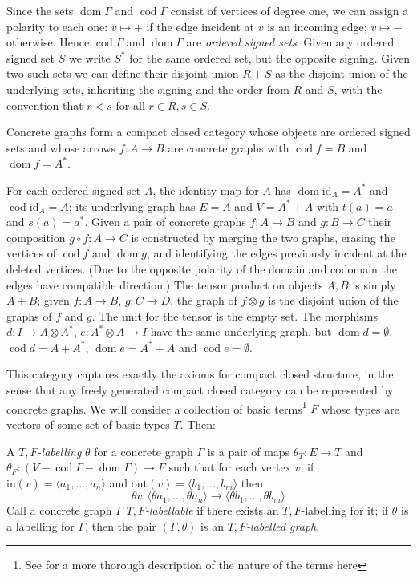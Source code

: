 \documentclass[runningheads]{llncs}
\newcommand{\dom}{\operatorname{dom}}
\newcommand{\cod}{\operatorname{cod}}
\newcommand{\id}[1]{\ensuremath{\mathrm{id}_{#1}}}
\begin{document}
Since the sets $\dom\Gamma$ and $\cod\Gamma$ consist of vertices of degree
one, we can assign a polarity to each one:  $v \mapsto +$ if the edge
incident at $v$ is an incoming edge; $v \mapsto -$ otherwise.  Hence
$\cod \Gamma$ and $\dom \Gamma$ are \emph{ordered signed sets}.  Given any
ordered signed set $S$ we write $S^*$ for the same ordered set, but
the opposite signing.   Given two such sets we can define their disjoint
union $R+S$ as the disjoint union of the underlying sets, inheriting
the signing and the order from $R$ and $S$, with the convention that
$r < s$ for all $r\in R, s\in S$.

\begin{proposition}
Concrete graphs form a compact closed category whose objects are
ordered signed sets and whose arrows $f:A\to B$ are concrete graphs with
$\cod f = B$  and $\dom f = A^*$.
\end{proposition}
For each ordered signed set $A$, the identity map for $A$ has
$\dom \id{A} = A^*$ and $\cod \id{A} = A$; its underlying
graph has $E = A$ and $V = A^* + A$ with $t(a) = a$ and $s(a) =
a^*$.  Given a pair of concrete graphs $f:A\to B$ and $g:B\to C$ their
composition $g\circ f:A\to C$ is constructed by merging the two
graphs, erasing the vertices of $\cod f$ and $\dom g$, and identifying
the edges previously incident at the deleted vertices.  (Due to the
opposite polarity of the domain and codomain the edges have compatible
direction.)  The tensor product on objects $A,B$ is simply $A+B$;
given $f:A\to B$, $g: C\to D$, the graph of $f \otimes g$ is the
disjoint union of the graphs of $f$ and $g$.  The unit for the tensor
is the empty set.  The morphisms $d : I \to A \otimes A^*$,
$e: A^* \otimes A \to I$ have the same underlying graph, but $\dom d =
\emptyset$, $\cod d = A+A^*$, $\dom e = A^*+A$ and $\cod e = \emptyset$.

This category captures exactly the axioms for compact closed
structure, in the sense that any freely generated compact closed
category can be represented by concrete graphs.  We will consider
a collection of basic terms\footnote{See \cite{Duncan:thesis:2006} for
  a more thorough description of the nature of the terms here} $F$
whose types are vectors of some set of basic types $T$.  Then:

\begin{definition}
  A \emph{$T,F$-labelling} $\theta$ for a concrete graph $\Gamma$ is a pair of
  maps  $\theta_T : E \to T$ and $\theta_F : (V - \cod\Gamma -
  \dom\Gamma) \to F$  such that for each vertex  $v$, if
  $\text{in}(v) = \langle a_1, \ldots, a_n\rangle$ and $\text{out}(v)
  = \langle b_1, \ldots, b_m\rangle$ then 
  \[
  \theta v : \langle \theta a_1, \ldots, \theta a_n \rangle
  \to 
  \langle \theta b_1, \ldots, \theta b_m \rangle
  \]
  Call a concrete graph $\Gamma$ \emph{$T,F$-labellable} if there exists an 
  $T,F$-labelling for it; if $\theta$ is a labelling for $\Gamma$, then
 the pair $(\Gamma,\theta)$ is an \emph{$T,F$-labelled graph}.
\end{definition}
\end{document}
